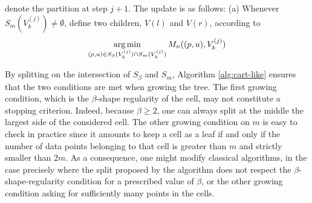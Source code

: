 \documentclass[paper=a4, fontsize=11pt]{scrartcl}
\newcommand{\argmin}{\operatornamewithlimits{\arg\min}}
\begin{document}
\begin{algorithm}[h]
\begin{algorithmic}[h]
\Statex{} denote the partition at step $j+1$. The update is as follows: 
\Statex\hspace{\algorithmicindent}\hspace{\algorithmicindent}
(a) Whenever $S_m(V^{(j)}_k) \neq \emptyset $, define two children, $V(l)$ and $V(r)$, according to
$$\argmin_{(p,u) \in S_\beta(V^{(j)}_k)\cap S_m(V^{(j)}_k) } M_n( (p,u) , V^{(j)}_k) $$
\hspace{\algorithmicindent}\hspace{\algorithmicindent}{ If the above optimization problem has no solution, just pick $p$ as the largest side} 
\Statex\hspace{\algorithmicindent}
\Statex \hspace{\algorithmicindent}
\EndFor
\Statex{}
   \EndFor
{}
\end{algorithmic}
\caption{CART-like regression tree}
\label{alg:cart-like}
\end{algorithm}

By splitting on the intersection of $S_\beta$ and $S_m$,  Algorithm \ref{alg:cart-like} ensures that the two conditions are met when growing the tree. The first growing condition, which is the $\beta$-shape regularity of the cell, may not constitute a stopping criterion. Indeed, because $\beta\geq 2$, one can always split at the middle the largest side of the considered cell. The other growing condition on $m$ is easy to check in practice since it amounts to keep a cell as a leaf if and only if the number of data points belonging to that cell is greater than $m$ and strictly smaller than $2m$. As a consequence, one might modify classical algorithms, in the case precisely where the split proposed by the algorithm does not respect the $\beta$-shape-regularity condition for a prescribed value of $\beta$, or the other growing condition asking for sufficiently many points in the cells. 
\end{document}
